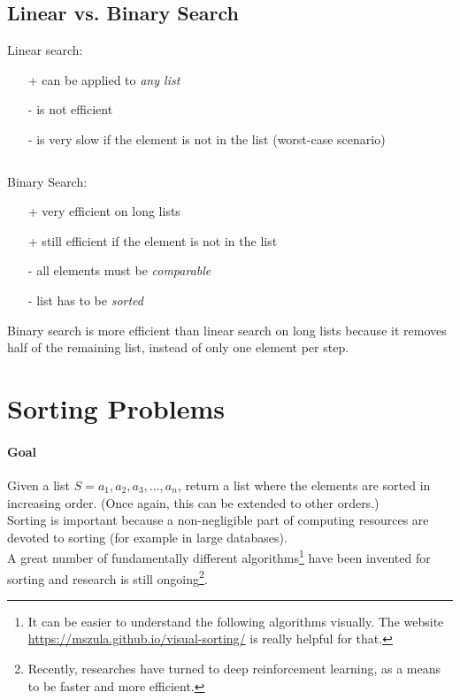\documentclass[10pt,a4paper]{book}
\begin{document}
\subsection{Linear vs. Binary Search}
\begin{multicols}{2}
Linear search:
\begin{itemize}
\item[+]can be applied to \textit{any list}
\item[-]is not efficient
\item[-]is very slow if the element is not in the list (worst-case scenario)\par
$\ $\par
\end{itemize}
\columnbreak
Binary Search:
\begin{itemize}
\item[+]very efficient on long lists
\item[+]still efficient if the element is not in the list
\item[-]all elements must be \textit{comparable}
\item[-]list has to be \textit{sorted}
\end{itemize}
\end{multicols}
Binary search is more efficient than linear search on long lists because it removes half of the remaining list, instead of only one element per step.

\section{Sorting Problems}
\paragraph*{Goal}
Given a list $S = a_{1},a_{2},a_{3},...,a_{n}$, return a list where the elements are sorted in increasing order. (Once again, this can be extended to other orders.)\\
Sorting is important because a non-negligible part of computing resources are devoted to sorting (for example in large databases). \\
A great number of fundamentally different algorithms\footnote{It can be easier to understand the following algorithms visually. The website \url{https://mszula.github.io/visual-sorting/} is really helpful for that.} have been invented for sorting and research is still ongoing\footnote{Recently, researches have turned to deep reinforcement learning, as a means to be faster and more efficient.}.
\end{document}
